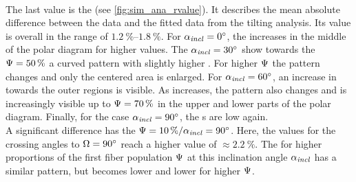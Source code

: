 \paragraph{\rvalue}
The last value is the \rvalue{} (see \cref{fig:sim_ana_rvalue}).
It describes the mean absolute difference between the data and the fitted data from the tilting analysis.
Its value is overall in the range of $\SIrange{1.2}{1.8}{\percent}$.
For $\textnormal{$\alpha_{\mathit{incl}}$} = \SI{0}{\degree}$, the \rvalue{} increases in the middle of the polar diagram for higher \modelPsi{} values.
The $\textnormal{$\alpha_{\mathit{incl}}$} = \SI{30}{\degree}$ show towards the $\textnormal{$\Psi$} = \SI{50}{\percent}$ a curved pattern with slightly higher \rvalue{}.
For higher $\textnormal{$\Psi$}$ the pattern changes and only the centered area is enlarged.
For $\textnormal{$\alpha_{\mathit{incl}}$} = \SI{60}{\degree}$, an increase in \rvalue{} towards the outer regions is visible.
As \modelInc{} increases, the pattern also changes and is increasingly visible up to $\textnormal{$\Psi$}=\SI{70}{\percent}$ in the upper and lower parts of the polar diagram.
Finally, for the case $\textnormal{$\alpha_{\mathit{incl}}$} = \SI{90}{\degree}$, the \rvalue s are low again.
\\
% 
A significant difference has the $\textnormal{$\Psi$} = \SI{10}{\percent} / \textnormal{$\alpha_{\mathit{incl}}$} = \SI{90}{\degree}$.
Here, the values for the crossing angles to $\textnormal{$\Omega$} = \SI{90}{\degree}$ reach a higher value of $\approx \SI{2.2}{\percent}$.
The \rvalue{} for higher proportions of the first fiber population $\textnormal{$\Psi$}$ at this inclination angle $\textnormal{$\alpha_{\mathit{incl}}$}$ has a similar pattern, but becomes lower and lower for higher $\textnormal{$\Psi$}$.
% 
% 
% 
% 
